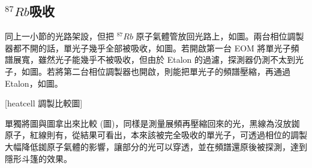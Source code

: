\documentclass[class=NCU_thesis, crop=false]{standalone}
\begin{document}
\subsection{$^{87}Rb$吸收}
同上一小節的光路架設，但把 $^{87}Rb$ 原子氣體管放回光路上，如圖。兩台相位調製器都不開的話，單光子幾乎全部被吸收，如圖。若開啟第一台 EOM 將單光子頻譜展寬，雖然光子能幾乎不被吸收，但由於 Etalon 的過濾，探測器仍測不太到光子，如圖。若將第二台相位調製器也開啟，則能把單光子的頻譜壓縮，再通過 Etalon，如圖。

[heatcell 調製比較圖]

單獨將圖與圖拿出來比較 (圖)，同樣是測量展頻再壓縮回來的光，黑線為沒放銣原子，紅線則有，從結果可看出，本來該被完全吸收的單光子，可透過相位的調製大幅降低銣原子氣體的影響，讓部分的光可以穿透，並在頻譜還原後被探測，達到隱形斗篷的效果。
\end{document}
